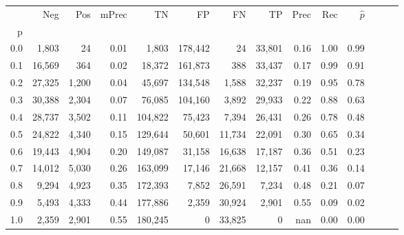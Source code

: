 \begin{tabular}{rrrrrrrrrrrrrr}
\toprule
{} &     Neg &    Pos & mPrec &       TN &       FP &      FN &      TP &  Prec &   Rec & $\hat{p}$ \\
p   &         &        &       &          &          &         &         &       &       &           \\
\midrule
0.0 &   1,803 &     24 &  0.01 &    1,803 &  178,442 &      24 &  33,801 &  0.16 &  1.00 &      0.99 \\
0.1 &  16,569 &    364 &  0.02 &   18,372 &  161,873 &     388 &  33,437 &  0.17 &  0.99 &      0.91 \\
0.2 &  27,325 &  1,200 &  0.04 &   45,697 &  134,548 &   1,588 &  32,237 &  0.19 &  0.95 &      0.78 \\
0.3 &  30,388 &  2,304 &  0.07 &   76,085 &  104,160 &   3,892 &  29,933 &  0.22 &  0.88 &      0.63 \\
0.4 &  28,737 &  3,502 &  0.11 &  104,822 &   75,423 &   7,394 &  26,431 &  0.26 &  0.78 &      0.48 \\
0.5 &  24,822 &  4,340 &  0.15 &  129,644 &   50,601 &  11,734 &  22,091 &  0.30 &  0.65 &      0.34 \\
0.6 &  19,443 &  4,904 &  0.20 &  149,087 &   31,158 &  16,638 &  17,187 &  0.36 &  0.51 &      0.23 \\
0.7 &  14,012 &  5,030 &  0.26 &  163,099 &   17,146 &  21,668 &  12,157 &  0.41 &  0.36 &      0.14 \\
0.8 &   9,294 &  4,923 &  0.35 &  172,393 &    7,852 &  26,591 &   7,234 &  0.48 &  0.21 &      0.07 \\
0.9 &   5,493 &  4,333 &  0.44 &  177,886 &    2,359 &  30,924 &   2,901 &  0.55 &  0.09 &      0.02 \\
1.0 &   2,359 &  2,901 &  0.55 &  180,245 &        0 &  33,825 &       0 &   nan &  0.00 &      0.00 \\
\bottomrule
\end{tabular}
